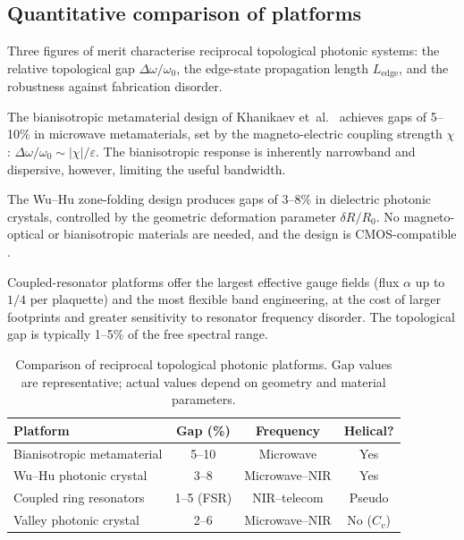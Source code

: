 \subsection{Quantitative comparison of platforms}
\label{sec:ch11-platform-comparison}

Three figures of merit characterise reciprocal topological photonic
systems: the relative topological gap $\Delta\omega/\omega_0$, the
edge-state propagation length $L_{\mathrm{edge}}$, and the
robustness against fabrication disorder.

The bianisotropic metamaterial design of Khanikaev et~al.\
\cite{khanikaev2013photonic} achieves gaps of 5--10\% in microwave
metamaterials, set by the magneto-electric coupling strength
$\chi$: $\Delta\omega/\omega_0\sim|\chi|/\varepsilon$.  The
bianisotropic response is inherently narrowband and dispersive,
however, limiting the useful bandwidth.

The Wu--Hu zone-folding design produces gaps of 3--8\% in dielectric
photonic crystals, controlled by the geometric deformation parameter
$\delta R/R_0$.  No magneto-optical or bianisotropic materials are
needed, and the design is CMOS-compatible
\cite{ozawa2018topological}.

Coupled-resonator platforms offer the largest effective gauge fields
(flux $\alpha$ up to $1/4$ per plaquette) and the most flexible band
engineering, at the cost of larger footprints and greater sensitivity
to resonator frequency disorder.  The topological gap is typically
1--5\% of the free spectral range.

\begin{table}[t]
\centering
\caption{Comparison of reciprocal topological photonic platforms.
Gap values are representative; actual values depend on geometry and
material parameters.}
\label{tab:ch11-platform-comparison}
\begin{tabular}{lccc}
\hline
\textbf{Platform} & \textbf{Gap (\%)} & \textbf{Frequency} &
\textbf{Helical?} \\
\hline
Bianisotropic metamaterial & 5--10 & Microwave & Yes \\
Wu--Hu photonic crystal & 3--8 & Microwave--NIR & Yes \\
Coupled ring resonators & 1--5 (FSR) & NIR--telecom & Pseudo \\
Valley photonic crystal & 2--6 & Microwave--NIR & No ($C_v$) \\
\hline
\end{tabular}
\end{table}

